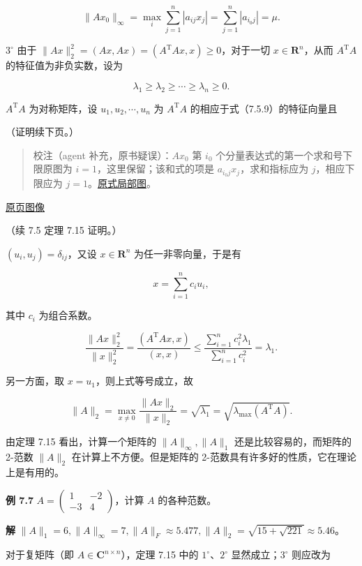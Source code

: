 \documentclass[
  10pt,
  fontset=fandol]{ctexart}
\begin{document}
\[
\|Ax_0\|_\infty=\max_i\sum_{j=1}^{n}|a_{ij}x_j|=\sum_{j=1}^{n}|a_{i_0j}|=\mu.
\]

\(3^\circ\) 由于 \(\|Ax\|_2^2=(Ax,Ax)=(A^{\mathrm T}Ax,x)\geqslant0\)，对于一切 \(x\in\mathbf R^n\)，从而 \(A^{\mathrm T}A\) 的特征值为非负实数，设为

\[
\lambda_1\geqslant\lambda_2\geqslant\cdots\geqslant\lambda_n\geqslant0.
\tag{7.5.9}
\]

\(A^{\mathrm T}A\) 为对称矩阵，设 \(u_1,u_2,\cdots,u_n\) 为 \(A^{\mathrm T}A\) 的相应于式（7.5.9）的特征向量且

（证明续下页。）

\begin{quote}
校注（agent 补充，原书疑误）：\(Ax_0\) 第 \(i_0\) 个分量表达式的第一个求和号下限原图为 \(i=1\)，这里保留；该和式的项是 \(a_{i_0j}x_j\)，求和指标应为 \(j\)，相应下限应为 \(j=1\)。\href{../assets/ch07b/203-sum-index.png}{原式局部图}。
\end{quote}

\href{../../source-images/pdf-204.jpeg}{原页图像}

（续 7.5 定理 7.15 证明。）

\((u_i,u_j)=\delta_{ij}\)，又设 \(x\in\mathbf R^n\) 为任一非零向量，于是有

\[
x=\sum_{i=1}^{n}c_iu_i,
\]

其中 \(c_i\) 为组合系数。

\[
\frac{\|Ax\|_2^2}{\|x\|_2^2}
=\frac{(A^{\mathrm T}Ax,x)}{(x,x)}
\leqslant\frac{\sum_{i=1}^{n}c_i^2\lambda_1}{\sum_{i=1}^{n}c_i^2}=\lambda_1.
\]

另一方面，取 \(x=u_1\)，则上式等号成立，故

\[
\|A\|_2=\max_{x\neq0}\frac{\|Ax\|_2}{\|x\|_2}=\sqrt{\lambda_1}=\sqrt{\lambda_{\max}(A^{\mathrm T}A)}.
\]

由定理 7.15 看出，计算一个矩阵的 \(\|A\|_\infty,\|A\|_1\) 还是比较容易的，而矩阵的 2-范数 \(\|A\|_2\) 在计算上不方便。但是矩阵的 2-范数具有许多好的性质，它在理论上是有用的。

\textbf{例 7.7} \(A=\begin{pmatrix}1&-2\\-3&4\end{pmatrix}\)，计算 \(A\) 的各种范数。

\textbf{解} \(\|A\|_1=6,\|A\|_\infty=7,\|A\|_F\approx5.477,\|A\|_2=\sqrt{15+\sqrt{221}}\approx5.46\)。

对于复矩阵（即 \(A\in\mathbf C^{n\times n}\)），定理 7.15 中的 \(1^\circ\)、\(2^\circ\) 显然成立；\(3^\circ\) 则应改为
\end{document}
